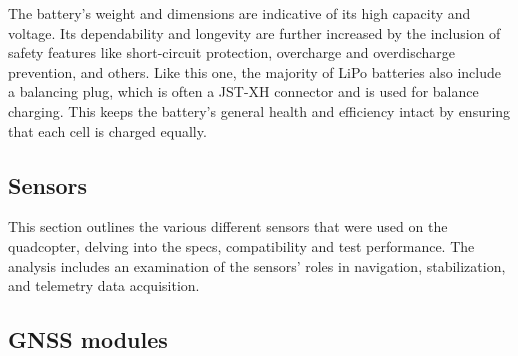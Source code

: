 \documentclass{article}
\begin{document}
The battery's weight and dimensions are indicative of its high capacity and
voltage. Its dependability and longevity are further increased by the inclusion
of safety features like short-circuit protection, overcharge and overdischarge
prevention, and others. Like this one, the majority of LiPo batteries also
include a balancing plug, which is often a JST-XH connector and is used for
balance charging. This keeps the battery's general health and efficiency intact
by ensuring that each cell is charged equally.

\subsection{Sensors}
This section outlines the various different sensors that were used on the
quadcopter, delving into the specs, compatibility and test performance. The
analysis includes an examination of the sensors' roles in navigation,
stabilization, and telemetry data acquisition.

\subsection*{GNSS modules}
\end{document}
